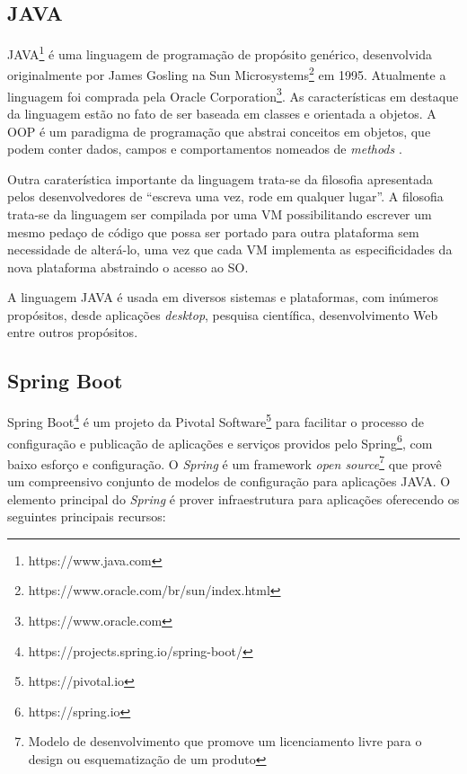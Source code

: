 \subsection{JAVA}

JAVA\footnote{https://www.java.com} é uma linguagem de programação de propósito genérico, desenvolvida originalmente por James Gosling na Sun Microsystems\footnote{ https://www.oracle.com/br/sun/index.html} em 1995. Atualmente a linguagem foi comprada pela Oracle Corporation\footnote{https://www.oracle.com}. As características em destaque da linguagem estão no fato de ser baseada em classes e orientada a objetos. A \ac{OOP} é um paradigma de programação que abstrai conceitos em objetos, que podem conter dados, campos e comportamentos nomeados de \textit{methods} \citep{Lewis2000}.

Outra caraterística importante da linguagem trata-se da filosofia apresentada pelos desenvolvedores de “escreva uma vez, rode em qualquer lugar”. A filosofia trata-se da linguagem ser compilada por uma \ac{VM} possibilitando escrever um mesmo pedaço de código que possa ser portado para outra plataforma sem necessidade de alterá-lo, uma vez que cada \ac{VM} implementa as especificidades da nova plataforma abstraindo o acesso ao \ac{SO}.

A linguagem JAVA é usada em diversos sistemas e plataformas, com inúmeros propósitos, desde aplicações \textit{desktop}, pesquisa científica, desenvolvimento Web entre outros propósitos.

\subsection{Spring Boot}

Spring Boot\footnote{https://projects.spring.io/spring-boot/} é um projeto da Pivotal Software\footnote{https://pivotal.io} para facilitar o processo de configuração e publicação de aplicações e serviços providos pelo Spring\footnote{https://spring.io}, com baixo esforço e configuração. O \textit{Spring} é um framework \textit{open source}\footnote{Modelo de desenvolvimento que promove um licenciamento livre para o design ou esquematização de um produto} que provê um compreensivo conjunto de modelos de configuração para aplicações JAVA. O elemento principal do \textit{Spring} é prover infraestrutura para aplicações oferecendo os seguintes principais recursos:

